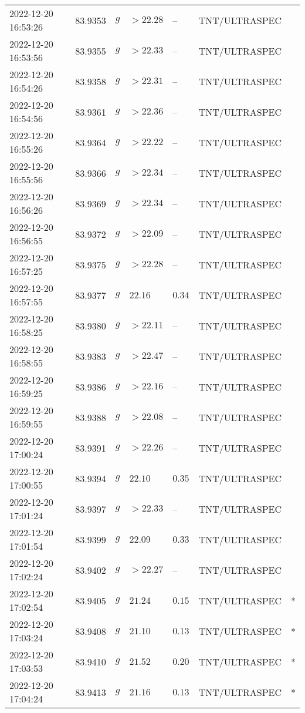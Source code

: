 \documentclass{nature_plusfigure}
\begin{document}
\begin{supplement}
\begin{center}
\begin{longtable}{lllllll}
2022-12-20 16:53:26 & 83.9353 & $g$ & $>22.28$ & -- & TNT/ULTRASPEC &  \\ 
2022-12-20 16:53:56 & 83.9355 & $g$ & $>22.33$ & -- & TNT/ULTRASPEC &  \\ 
2022-12-20 16:54:26 & 83.9358 & $g$ & $>22.31$ & -- & TNT/ULTRASPEC &  \\ 
2022-12-20 16:54:56 & 83.9361 & $g$ & $>22.36$ & -- & TNT/ULTRASPEC &  \\ 
2022-12-20 16:55:26 & 83.9364 & $g$ & $>22.22$ & -- & TNT/ULTRASPEC &  \\ 
2022-12-20 16:55:56 & 83.9366 & $g$ & $>22.34$ & -- & TNT/ULTRASPEC &  \\ 
2022-12-20 16:56:26 & 83.9369 & $g$ & $>22.34$ & -- & TNT/ULTRASPEC &  \\ 
2022-12-20 16:56:55 & 83.9372 & $g$ & $>22.09$ & -- & TNT/ULTRASPEC &  \\ 
2022-12-20 16:57:25 & 83.9375 & $g$ & $>22.28$ & -- & TNT/ULTRASPEC &  \\ 
2022-12-20 16:57:55 & 83.9377 & $g$ & $22.16$ & $0.34$ & TNT/ULTRASPEC &  \\ 
2022-12-20 16:58:25 & 83.9380 & $g$ & $>22.11$ & -- & TNT/ULTRASPEC &  \\ 
2022-12-20 16:58:55 & 83.9383 & $g$ & $>22.47$ & -- & TNT/ULTRASPEC &  \\ 
2022-12-20 16:59:25 & 83.9386 & $g$ & $>22.16$ & -- & TNT/ULTRASPEC &  \\ 
2022-12-20 16:59:55 & 83.9388 & $g$ & $>22.08$ & -- & TNT/ULTRASPEC &  \\ 
2022-12-20 17:00:24 & 83.9391 & $g$ & $>22.26$ & -- & TNT/ULTRASPEC &  \\ 
2022-12-20 17:00:55 & 83.9394 & $g$ & $22.10$ & $0.35$ & TNT/ULTRASPEC &  \\ 
2022-12-20 17:01:24 & 83.9397 & $g$ & $>22.33$ & -- & TNT/ULTRASPEC &  \\ 
2022-12-20 17:01:54 & 83.9399 & $g$ & $22.09$ & $0.33$ & TNT/ULTRASPEC &  \\ 
2022-12-20 17:02:24 & 83.9402 & $g$ & $>22.27$ & -- & TNT/ULTRASPEC &  \\ 
2022-12-20 17:02:54 & 83.9405 & $g$ & $21.24$ & $0.15$ & TNT/ULTRASPEC & * \\ 
2022-12-20 17:03:24 & 83.9408 & $g$ & $21.10$ & $0.13$ & TNT/ULTRASPEC & * \\ 
2022-12-20 17:03:53 & 83.9410 & $g$ & $21.52$ & $0.20$ & TNT/ULTRASPEC & * \\ 
2022-12-20 17:04:24 & 83.9413 & $g$ & $21.16$ & $0.13$ & TNT/ULTRASPEC & * \\ 

\end{longtable}
\end{center}
\end{supplement}
\end{document}

